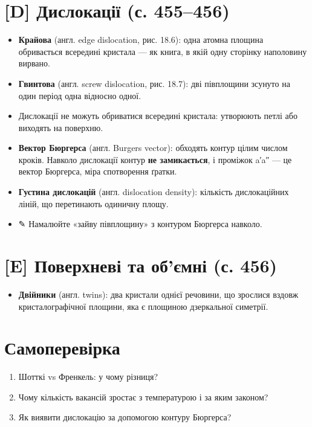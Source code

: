 \documentclass[11pt,a4paper,oneside]{book}
\newcommand{\pen}{{\sffamily\color{accent}✎}}
\begin{document}
\section*{[D] Дислокації (с. 455–456)}
\begin{itemize}
\item \textbf{Крайова} (англ. edge dislocation, рис. 18.6): одна атомна площина обривається всередині кристала — як книга, в якій одну сторінку наполовину вирвано.
\item \textbf{Гвинтова} (англ. screw dislocation, рис. 18.7): дві півплощини зсунуто на один період одна відносно одної.
\item Дислокації не можуть обриватися всередині кристала: утворюють петлі або виходять на поверхню.
\item \textbf{Вектор Бюргерса} (англ. Burgers vector): обходять контур цілим числом кроків. Навколо дислокації контур \textbf{не замикається}, і проміжок a′a″ — це вектор Бюргерса, міра спотворення ґратки.
\item \textbf{Густина дислокацій} (англ. dislocation density): кількість дислокаційних ліній, що перетинають одиничну площу.
\item \pen{} Намалюйте «зайву півплощину» з контуром Бюргерса навколо.
\end{itemize}

\section*{[E] Поверхневі та об'ємні (с. 456)}
\begin{itemize}
\item \textbf{Двійники} (англ. twins): два кристали однієї речовини, що зрослися вздовж кристалографічної площини, яка є площиною дзеркальної симетрії.
\end{itemize}

\section*{Самоперевірка}
\begin{enumerate}
\item Шотткі vs Френкель: у чому різниця?
\item Чому кількість вакансій зростає з температурою і за яким законом?
\item Як виявити дислокацію за допомогою контуру Бюргерса?
\end{enumerate}
\end{document}
